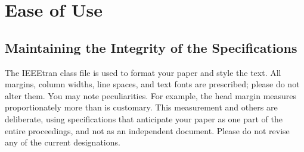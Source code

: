 \documentclass[conference]{IEEEtran}
\begin{document}

\section{Ease of Use}

\subsection{Maintaining the Integrity of the Specifications}

The IEEEtran class file is used to format your paper and style the text. All margins, 
column widths, line spaces, and text fonts are prescribed; please do not 
alter them. You may note peculiarities. For example, the head margin
measures proportionately more than is customary. This measurement 
and others are deliberate, using specifications that anticipate your paper 
as one part of the entire proceedings, and not as an independent document. 
Please do not revise any of the current designations.
\end{document}

